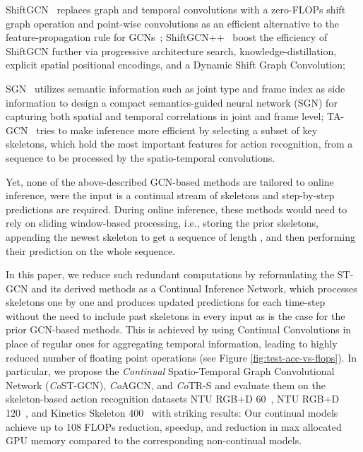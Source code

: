 \documentclass[journal]{IEEEtran}
\theoremstyle{definition}
\begin{document}
ShiftGCN~\cite{cheng2020skeleton} replaces graph and temporal convolutions with a zero-FLOPs shift graph operation and point-wise convolutions as an efficient alternative to the feature-propagation rule for GCNs~\cite{kipf2016semi}; 
ShiftGCN++~\cite{cheng2021extremely} boost the efficiency of ShiftGCN further via progressive architecture search, knowledge-distillation, explicit spatial positional encodings, and a Dynamic Shift Graph Convolution; 

SGN~\cite{zhang2020semantics} utilizes semantic information such as joint type and frame index as side information to design a compact semantics-guided neural network (SGN) for capturing both spatial and temporal correlations in joint and frame level; 
TA-GCN~\cite{negarTAGCN} tries to make inference more efficient by selecting a subset of key skeletons, which hold the most important features for action recognition, from a sequence to be processed by the spatio-temporal convolutions. 


Yet, none of the above-described GCN-based methods are tailored to online inference, were the input is a continual stream of skeletons and step-by-step predictions are required. 
During online inference, these methods would need to rely on sliding window-based processing, i.e., storing the  prior skeletons, appending the newest skeleton to get a sequence of length , and then performing their prediction on the whole sequence. 

In this paper, we reduce such redundant computations by reformulating the ST-GCN and its derived methods as a Continual Inference Network, which processes skeletons one by one and produces updated predictions for each time-step without the need to include past skeletons in every input as is the case for the prior GCN-based methods. 
This is achieved by using Continual Convolutions in place of regular ones for aggregating temporal information, leading to highly reduced number of floating point operations (see Figure \ref{fig:test-acc-vs-flops}). 
In particular, we propose the \textit{Continual} Spatio-Temporal Graph Convolutional Network (\textit{Co}ST-GCN), \textit{Co}AGCN, and \textit{Co}TR-S and evaluate them on the skeleton-based action recognition datasets NTU RGB+D 60~\cite{Shahroudy_2016_NTURGBD}, NTU RGB+D 120~\cite{Liu_2019_NTURGBD120}, and Kinetics Skeleton 400~\cite{kay2017kinetics} with striking results: Our continual models achieve up to 108 FLOPs reduction,  speedup, and  reduction in max allocated GPU memory compared to the corresponding non-continual models.
\end{document}
